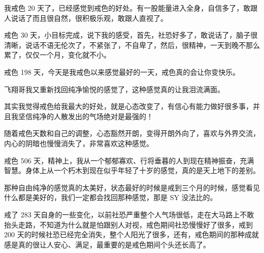 \begin{case}[戒色]
    我戒色 20 天了，已经感觉到戒色的好处。有一股能量进入全身，自信多了，敢跟人说话了而且很自然，很积极乐观，敢跟人直视了。
\end{case}

\begin{case}[戒色]
    戒色 30 天，小目标完成，说下我的感受，首先，社恐好多了，敢说话了，脑子很清晰，说话不语无伦次了，不紧张了，不自卑了，然后，很精神，一天到晚不那么累了，仅仅一个月，变化就不小。
\end{case}

\begin{case}[戒色]
    戒色 198 天，今天是我戒色以来感觉最好的一天，戒色真的会让你变快乐。
\end{case}

\begin{case}[戒色]
    飞翔哥我又重新找回纯净愉悦的感觉了，这种感觉真的让我泪流满面。
\end{case}

\begin{case}[戒色]
    其实我觉得戒色给我最大的好处，就是心态改变了，有信心有能力做好很多事，并且我坚信纯净的人散发出的气场绝对是最强的！
\end{case}

\begin{case}[戒色]
    随着戒色天数和自己的调整，心态豁然开朗，变得开朗外向了，喜欢与外界交流，内心的阴暗也慢慢消失了，非常喜欢这种感觉。
\end{case}

\begin{case}[戒色]
    戒色 506 天，精神上，我从一个郁郁寡欢、行将垂暮的人到现在精神振奋，充满智慧。身体上从一个朽木到现在似乎年轻了十岁的感觉，真的是天上地下的差别。
\end{case}

\begin{case}[戒色]
    那种自由纯净的感觉真的太美好，状态最好的时候是戒到三个月的时候，感觉看见什么都是美好的，我们一定都会找回那种感觉，那是 SY 没法比的。
\end{case}

\begin{case}[戒色]
    戒了 283 天自身的一些变化，以前社恐严重整个人气场很低，走在大马路上不敢抬头走路，不知道为什么就是怕跟别人对视，戒色期间社恐慢慢好了很多，戒到 200 天的时候社恐已经完全消失，整个人阳光了很多，还有，戒色期间的那种成就感是真的很让人安心、满足，最重要的是戒色期间个头还长高了。
\end{case}

